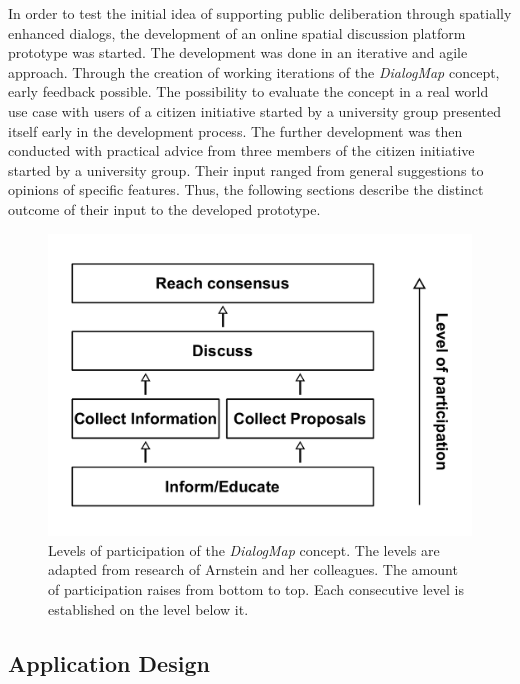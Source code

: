 In order to test the initial idea of supporting public deliberation through spatially enhanced dialogs, the development of an online spatial discussion platform prototype was started. The development was done in an iterative and agile approach. Through the creation of working iterations of the \textit{DialogMap} concept, early feedback possible. The possibility to evaluate the concept in a real world use case with users of a citizen initiative started by a university group presented itself early in the development process. The further development was then conducted with practical advice from three members of the citizen initiative started by a university group. Their input ranged from general suggestions to opinions of specific features. Thus, the following sections describe the distinct outcome of their input to the developed prototype.

\begin{figure}[h]
    \centering
    \includegraphics[width=1\columnwidth]{images/my_ladder}
    \caption{Levels of participation of the \textit{DialogMap} concept. The levels are adapted from research of Arnstein and her colleagues. The amount of participation raises from bottom to top. Each consecutive level is established on the level below it.}
    \label{fig:my_ladder}
\end{figure}


\subsection{Application Design}
\label{sub:design}

